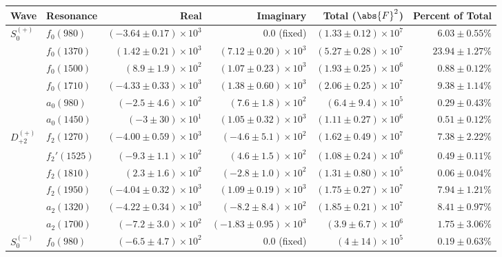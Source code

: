 \begin{table}[ht]
    \begin{center}
        \begin{tabular}{llrrrr}\toprule
        Wave & Resonance & Real & Imaginary & Total ($\abs{F}^2$) & Percent of Total \\\midrule
$S_{0}^{(+)}$ & $f_{0}(980)$ & $(-3.64 \pm 0.17) \times 10^{3}$ & $0.0$ (fixed) & $(1.33 \pm 0.12) \times 10^{7}$ & $6.03 \pm 0.55 \%$ \\
 & $f_{0}(1370)$ & $(1.42 \pm 0.21) \times 10^{3}$ & $(7.12 \pm 0.20) \times 10^{3}$ & $(5.27 \pm 0.28) \times 10^{7}$ & $23.94 \pm 1.27 \%$ \\
 & $f_{0}(1500)$ & $(8.9 \pm 1.9) \times 10^{2}$ & $(1.07 \pm 0.23) \times 10^{3}$ & $(1.93 \pm 0.25) \times 10^{6}$ & $0.88 \pm 0.12 \%$ \\
 & $f_{0}(1710)$ & $(-4.33 \pm 0.33) \times 10^{3}$ & $(1.38 \pm 0.60) \times 10^{3}$ & $(2.06 \pm 0.25) \times 10^{7}$ & $9.38 \pm 1.14 \%$ \\
 & $a_{0}(980)$ & $(-2.5 \pm 4.6) \times 10^{2}$ & $(7.6 \pm 1.8) \times 10^{2}$ & $(6.4 \pm 9.4) \times 10^{5}$ & $0.29 \pm 0.43 \%$ \\
 & $a_{0}(1450)$ & $(-3 \pm 30) \times 10^{1}$ & $(1.05 \pm 0.32) \times 10^{3}$ & $(1.11 \pm 0.27) \times 10^{6}$ & $0.51 \pm 0.12 \%$ \\
$D_{+2}^{(+)}$ & $f_{2}(1270)$ & $(-4.00 \pm 0.59) \times 10^{3}$ & $(-4.6 \pm 5.1) \times 10^{2}$ & $(1.62 \pm 0.49) \times 10^{7}$ & $7.38 \pm 2.22 \%$ \\
 & $f_{2}'(1525)$ & $(-9.3 \pm 1.1) \times 10^{2}$ & $(4.6 \pm 1.5) \times 10^{2}$ & $(1.08 \pm 0.24) \times 10^{6}$ & $0.49 \pm 0.11 \%$ \\
 & $f_{2}(1810)$ & $(2.3 \pm 1.6) \times 10^{2}$ & $(-2.8 \pm 1.0) \times 10^{2}$ & $(1.31 \pm 0.80) \times 10^{5}$ & $0.06 \pm 0.04 \%$ \\
 & $f_{2}(1950)$ & $(-4.04 \pm 0.32) \times 10^{3}$ & $(1.09 \pm 0.19) \times 10^{3}$ & $(1.75 \pm 0.27) \times 10^{7}$ & $7.94 \pm 1.21 \%$ \\
 & $a_{2}(1320)$ & $(-4.22 \pm 0.34) \times 10^{3}$ & $(-8.2 \pm 8.4) \times 10^{2}$ & $(1.85 \pm 0.21) \times 10^{7}$ & $8.41 \pm 0.97 \%$ \\
 & $a_{2}(1700)$ & $(-7.2 \pm 3.0) \times 10^{2}$ & $(-1.83 \pm 0.95) \times 10^{3}$ & $(3.9 \pm 6.7) \times 10^{6}$ & $1.75 \pm 3.06 \%$ \\
$S_{0}^{(-)}$ & $f_{0}(980)$ & $(-6.5 \pm 4.7) \times 10^{2}$ & $0.0$ (fixed) & $(4 \pm 14) \times 10^{5}$ & $0.19 \pm 0.63 \%$ \\

\end{tabular}
\end{center}
\end{table}
